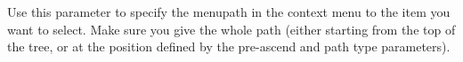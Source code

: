 
Use this parameter to specify the menupath in the context menu to the item you want to select. Make sure you give the whole path (either starting from the top of the tree, or at the position defined by the pre-ascend and path type parameters).


